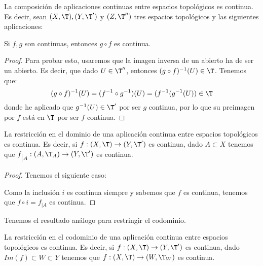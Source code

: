 \begin{lema}
    La composición de aplicaciones continuas entre espacios topológicos es continua. Es decir, sean $(X,\T),(Y,\T')$ y $(Z,\T'')$ tres espacios topológicos y las siguientes aplicaciones:
    \begin{figure}[H]
        \centering
    \end{figure}

    Si $f,g$ son continuas, entonces $g\circ f$ es continua.
\end{lema}
\begin{proof}
    Para probar esto, usaremos que la imagen inversa de un abierto ha de ser un abierto. Es decir, que dado $U\in \T''$, entonces $(g\circ f)^{-1}(U)\in \T$. Tenemos que:
    \begin{equation*}
        (g\circ f)^{-1}(U) = (f^{-1}\circ g^{-1})(U) = (f^{-1} (g^{-1}(U))\in \T
    \end{equation*}
    donde he aplicado que $g^{-1}(U)\in \T'$ por ser $g$ continua, por lo que su preimagen por $f$ está en $\T$ por ser $f$ continua.
\end{proof}

\begin{coro}
    La restricción en el dominio de una aplicación continua entre espacios topológicos es continua. Es decir, si $f:(X,\T)\to (Y,\T')$ es continua, dado $A\subset X$ tenemos que $f_{\big| A}:(A,\T_A)\to (Y,\T')$ es continua.
\end{coro}
\begin{proof}
    Tenemos el siguiente caso:
    \begin{figure}[H]
        \centering
    \end{figure}
    Como la inclusión $i$ es continua siempre y sabemos que $f$ es continua, tenemos que $f\circ i = f_{\big| A}$ es continua.
\end{proof}

Tenemos el resultado análogo para restringir el codominio.
\begin{coro}
    La restricción en el codominio de una aplicación continua entre espacios topológicos es continua. Es decir, si $f:(X,\T)\to (Y,\T')$ es continua, dado $Im(f)\subset W\subset Y$ tenemos que $f:(X,\T)\to (W,\T_W)$ es continua.
\end{coro}

